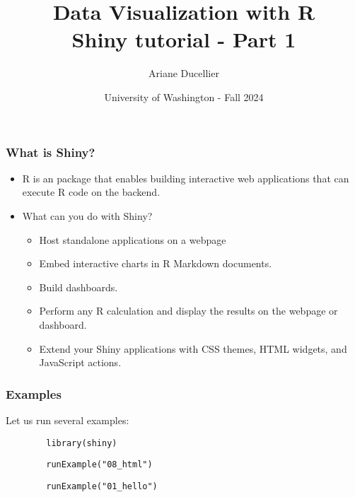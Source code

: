 \documentclass{beamer}
\title[Data Visualization with R - Shiny tutorial - Part 1]{Data Visualization with R \\ Shiny tutorial - Part 1}
\author{Ariane Ducellier}
\date{University of Washington - Fall 2024}
\begin{document}
	\begin{frame}
		\titlepage
	\end{frame}

	\begin{frame}
		\frametitle{What is Shiny?}

		\begin{itemize}
			\item R is an package that enables building interactive web applications that can execute R code on the backend.

			\vspace{1em}

			\item What can you do with Shiny?
			\begin{itemize}
				\item Host standalone applications on a webpage
				\item Embed interactive charts in R Markdown documents.
				\item Build dashboards.
				\item Perform any R calculation and display the results on the webpage or dashboard.
				\item Extend your Shiny applications with CSS themes, HTML widgets, and JavaScript actions.
			\end{itemize}
		\end{itemize}
		
	\end{frame}

	\begin{frame}[fragile]
		\frametitle{Examples}

		Let us run several examples:

		\vspace{2em}

		\begin{exampleblock}{}
		\begin{BVerbatim}
		library(shiny)
		\end{BVerbatim}
		\end{exampleblock}{}

		\vspace{2em}

		\begin{exampleblock}{}
		\begin{BVerbatim}
		runExample("08_html")
		\end{BVerbatim}
		\end{exampleblock}{}

		\vspace{2em}

		\begin{exampleblock}{}
		\begin{BVerbatim}
		runExample("01_hello")
		\end{BVerbatim}
		\end{exampleblock}{}

	\end{frame}
\end{document}
